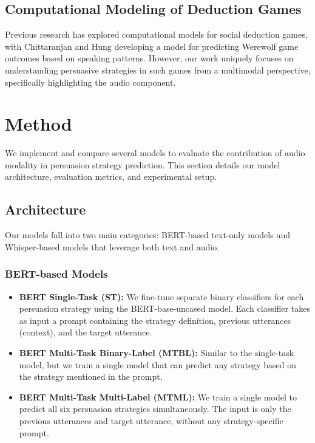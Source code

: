 \documentclass{article}
\begin{document}
\subsection{Computational Modeling of Deduction Games}
Previous research has explored computational models for social deduction games, with Chittaranjan and Hung \cite{chittaranjan2010you} developing a model for predicting Werewolf game outcomes based on speaking patterns. However, our work uniquely focuses on understanding persuasive strategies in such games from a multimodal perspective, specifically highlighting the audio component.

\section{Method}
We implement and compare several models to evaluate the contribution of audio modality in persuasion strategy prediction. This section details our model architecture, evaluation metrics, and experimental setup.

\subsection{Architecture}
Our models fall into two main categories: BERT-based text-only models and Whisper-based models that leverage both text and audio.

\subsubsection{BERT-based Models}
\begin{itemize}
    \item \textbf{BERT Single-Task (ST):} We fine-tune separate binary classifiers for each persuasion strategy using the BERT-base-uncased model. Each classifier takes as input a prompt containing the strategy definition, previous utterances (context), and the target utterance.
    
    \item \textbf{BERT Multi-Task Binary-Label (MTBL):} Similar to the single-task model, but we train a single model that can predict any strategy based on the strategy mentioned in the prompt.
    
    \item \textbf{BERT Multi-Task Multi-Label (MTML):} We train a single model to predict all six persuasion strategies simultaneously. The input is only the previous utterances and target utterance, without any strategy-specific prompt.
\end{itemize}
\end{document}
